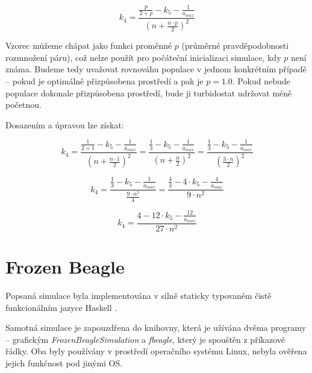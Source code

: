\begin{tcolorbox}[ title={Odvození vzorce pro $k_4$}
                 , breakable
                 ]
\begin{equation}
k_4  = \frac{\frac{p}{2 + p} -  {k_5} - \frac{1}{a_{max}}}{(n + \frac{n\cdot{}p}{2})^2}
\end{equation}


Vzorec můžeme chápat jako funkci proměnné $p$ (průměrné pravděpodobnosti rozmnožení páru), což nelze použít  pro
počáteční inicializaci simulace, kdy $p$ není známa. Budeme tedy uvažovat rovnováhu populace v jednom konkrétním
případě -- pokud je optimálně přizpůsobena prostředí a pak je $p = 1.0$. Pokud nebude populace dokonale přizpůsobena
prostředí, bude ji turbidostat udržovat méně početnou.

Dosazením a úpravou lze získat:



\begin{equation}
k_4  = \frac{\frac{1}{2 + 1} -  {k_5} - \frac{1}{a_{max}}}{(n + \frac{n\cdot{}1}{2})^2}
     = \frac{\frac{1}{3} -  {k_5} - \frac{1}{a_{max}}}{(n + \frac{n}{2})^2}
     = \frac{\frac{1}{3} -  {k_5} - \frac{1}{a_{max}}}{(\frac{3\cdot{}n}{2})^2}
\end{equation}

\begin{equation}
k_4  = \frac{\frac{1}{3} -  {k_5} - \frac{1}{a_{max}}}{\frac{9\cdot{}n^2}{4}}
     = \frac{\frac{4}{3} - 4\cdot{}{k_5} - \frac{4}{a_{max}}}{9\cdot{}n^2}
\end{equation}

\begin{equation}
k_4  = \frac{4 - 12\cdot{}{k_5} - \frac{12}{a_{max}}}{27\cdot{}n^2}
\end{equation}
\end{tcolorbox}

\section{Frozen Beagle}

Popsaná simulace byla implementována v silně staticky typovaném čistě funkcionálním jazyce Haskell \citep{marlow2010haskell}.

Samotná simulace je zapouzdřena do knihovny, která je užívána dvěma programy -- grafickým
\textit{FrozenBeagleSimulation} a \textit{fbeagle}, který je spouštěn z příkazové řádky. Oba byly používány v prostředí
operačního systému Linux, nebyla ověřena jejich funkčnost pod jinými OS.

